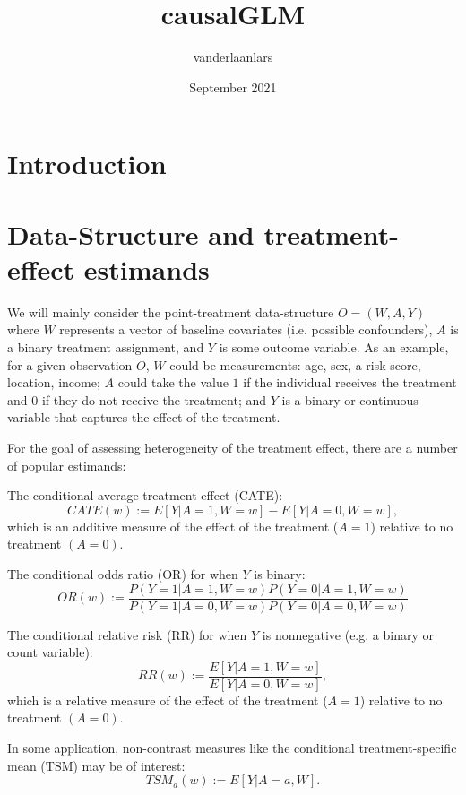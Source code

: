 \documentclass{article}
\title{causalGLM}
\author{vanderlaanlars }
\date{September 2021}
\begin{document}


\maketitle

 

\section{Introduction}

\section{Data-Structure and treatment-effect estimands}
We will mainly consider the point-treatment data-structure $O = (W,A,Y)$ where $W$ represents a vector of baseline covariates (i.e. possible confounders), $A$ is a binary treatment assignment, and $Y$ is some outcome variable. As an example, for a given observation $O$, $W$ could be measurements: age, sex, a risk-score, location, income; $A$ could take the value $1$ if the individual receives the treatment and $0$ if they do not receive the treatment; and $Y$ is a binary or continuous variable that captures the effect of the treatment.

For the goal of assessing heterogeneity of the treatment effect, there are a number of popular estimands:

\noindent The conditional average treatment effect (CATE):
\begin{equation}
    CATE(w) := E[Y|A=1,W=w] - E[Y|A=0, W=w],
\end{equation}
which is an additive measure of the effect of the treatment ($A=1$) relative to no treatment $(A=0)$.

\noindent The conditional odds ratio (OR) for when $Y$ is binary:
\begin{equation}
    OR(w) := \frac{P(Y=1|A=1,W=w)P(Y=0|A=1,W=w)}{P(Y=1|A=0,W=w)P(Y=0|A=0,W=w)}
\end{equation}

\noindent The conditional relative risk (RR) for when $Y$ is nonnegative (e.g. a binary or count variable):
\begin{equation}
    RR(w) := \frac{E[Y|A=1,W=w]}{E[Y|A=0,W=w]},
\end{equation}
which is a relative measure of the effect of the treatment ($A=1$) relative to no treatment $(A=0)$.

In some application, non-contrast measures like the conditional treatment-specific mean (TSM) may be of interest:
\begin{equation}
    TSM_a(w) := E[Y|A=a,W].
\end{equation}
\end{document}
